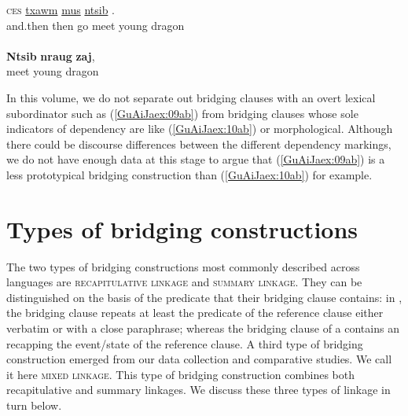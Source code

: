 \documentclass[output=paper]{LSP/langsci}
\begin{document}
\begin{exe}
\ex \label{GuAiJaex:10ab}
\begin{xlist}
\ex \label{GuAiJaex:10a}
\gll \textsc{ces} \underline{txawm} \underline{mus} \underline{ntsib} \underline{} \underline{}.\\
and.then then go meet young dragon\\ 
\glt {}\\
\ex \label{GuAiJaex:10b}
\gll \textbf{Ntsib} \textbf{nraug} \textbf{zaj},\\		
 meet young dragon \\ 
\glt {}
\end{xlist}
\end{exe}

In this volume, we do not separate out bridging clauses with an overt lexical subordinator such as (\ref{GuAiJaex:09ab}) from bridging clauses whose sole indicators of dependency are  like (\ref{GuAiJaex:10ab}) or morphological. Although there could be discourse differences between the different dependency markings, we do not have enough data at this stage to argue that (\ref{GuAiJaex:09ab}) is a less prototypical bridging construction than (\ref{GuAiJaex:10ab}) for example.

\section{Types of bridging constructions}\label{sec:guerin:3}
\label{GuAi3types}
The two types of bridging constructions most commonly described across languages are \textsc{recapitulative linkage} and \textsc{summary linkage}. They can be distinguished on the basis of the predicate that their bridging clause contains: in , the bridging clause repeats at least the predicate of the reference clause either verbatim or with a close paraphrase; whereas the bridging clause of a  contains an  recapping the event/state of the reference clause. A third type of bridging construction emerged from our data collection and comparative studies. We call it here \textsc{mixed linkage}. This type of bridging construction combines both recapitulative and summary linkages. We discuss these three types of linkage in turn below.
\end{document}
